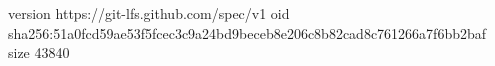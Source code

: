 version https://git-lfs.github.com/spec/v1
oid sha256:51a0fcd59ae53f5fcec3c9a24bd9beceb8e206c8b82cad8c761266a7f6bb2baf
size 43840
